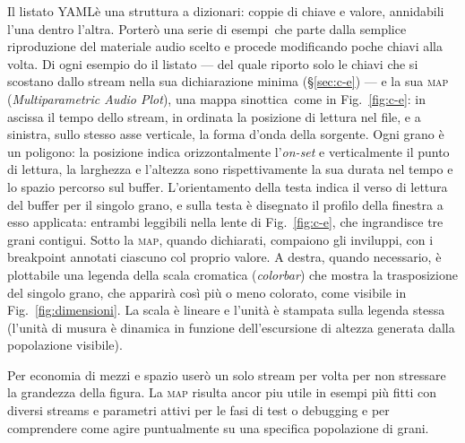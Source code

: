Il listato YAML\notaYML è una struttura a dizionari: coppie di chiave e valore,
annidabili l'una dentro l'altra.
Porterò una serie di esempi\notaEsempi\ che parte dalla semplice riproduzione
del materiale audio scelto e procede modificando poche chiavi alla volta.
Di ogni esempio do il listato — del quale riporto solo le chiavi che si
scostano dallo stream nella sua dichiarazione minima (\S\ref{sec:c-e}) — e la sua \textsc{map}
(\emph{Multiparametric Audio Plot}), una mappa sinottica\notaLineage\
come in Fig.~\ref{fig:c-e}: in ascissa il tempo dello stream, in ordinata la
posizione di lettura nel file, e a sinistra, sullo stesso asse verticale, la
forma d'onda della sorgente.
Ogni grano è un poligono: la posizione
indica orizzontalmente l'\emph{on-set} e verticalmente il punto di lettura,
la larghezza e l'altezza sono rispettivamente la sua durata nel tempo e lo spazio percorso sul buffer.
L'orientamento della testa indica il verso di lettura del buffer per il singolo grano, e sulla
testa è disegnato il profilo della
finestra a esso applicata: entrambi leggibili nella lente di
Fig.~\ref{fig:c-e}, che ingrandisce tre grani contigui.
Sotto la \textsc{map}, quando dichiarati, compaiono gli inviluppi, con i
breakpoint annotati ciascuno col proprio valore.
A destra, quando necessario, è plottabile una legenda della scala cromatica
(\emph{colorbar}) che mostra la trasposizione
del singolo grano, che
apparirà così più o meno colorato, come visibile in Fig.~\ref{fig:dimensioni}.
La scala è lineare e l'unità è stampata sulla legenda stessa (l'unità di musura è dinamica in funzione
dell'escursione di altezza generata dalla popolazione visibile).

Per economia di mezzi e spazio 
userò un solo stream per volta per non stressare la grandezza della figura.
La \textsc{map} risulta ancor piu utile in esempi più fitti con diversi streams e parametri attivi 
per le fasi di test o debugging e 
per comprendere come agire puntualmente su una 
specifica popolazione di grani.